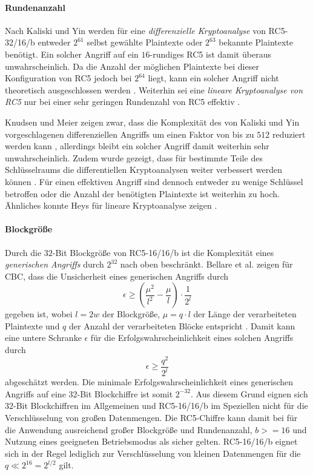 \documentclass[course=erap]{aspdoc}
\begin{document}
\paragraph{Rundenanzahl} Nach Kaliski und Yin werden für eine \textit{differenzielle Kryptoanalyse} von RC5-32/16/b entweder $2^{61}$ selbst gewählte Plaintexte oder $2^{63}$ bekannte Plaintexte benötigt. Ein solcher Angriff auf ein $16$-rundiges RC5 ist damit überaus unwahrscheinlich. Da die Anzahl der möglichen Plaintexte bei dieser Konfiguration von RC5 jedoch bei $2^{64}$ liegt, kann ein solcher Angriff nicht theoretisch ausgeschlossen werden \cite[p.6]{kaliski+yin}. Weiterhin sei eine \textit{lineare Kryptoanalyse von RC5} nur bei einer sehr geringen Rundenzahl von RC5 effektiv \cite[p.28]{kaliski+yin}.\bigbreak

Knudsen und Meier zeigen zwar, dass die Komplexität des von Kaliski und Yin vorgeschlagenen differenziellen Angriffs um einen Faktor von bis zu $512$ reduziert werden kann \cite[p.2]{knudsen+meier}, allerdings bleibt ein solcher Angriff damit weiterhin sehr unwahrscheinlich. Zudem wurde gezeigt, dass für bestimmte Teile des Schlüsselraums die differentiellen Kryptoanalysen weiter verbessert werden können \cite[p.13]{knudsen+meier}. Für einen effektiven Angriff sind dennoch entweder zu wenige Schlüssel betroffen oder die Anzahl der benötigten Plaintexte ist weiterhin zu hoch. Ähnliches konnte Heys für lineare Kryptoanalyse zeigen \cite[p.5]{heys}.

\paragraph{Blockgröße} Durch die $32$-Bit Blockgröße von RC5-16/16/b ist die Komplexität eines \textit{generischen Angriffs} durch $2^{32}$ nach oben beschränkt. Bellare et al. zeigen für CBC, dass die Unsicherheit eines generischen Angriffs durch
\[
    \epsilon \geq \left(\frac{\mu^2}{l^2} - \frac{\mu}{l}\right) \cdot \frac{1}{2^l}
\]
gegeben ist, wobei $l = 2w$ der Blockgröße, $\mu = q \cdot l$ der Länge der verarbeiteten Plaintexte und $q$ der Anzahl der verarbeiteten Blöcke entspricht \cite[p.5;24]{bellare}. Damit kann eine untere Schranke $\epsilon$ für die Erfolgswahrscheinlichkeit eines solchen Angriffs durch
\[
    \epsilon \geq \frac{q^2}{2^l}
\]
abgeschätzt werden. Die minimale Erfolgswahrscheinlichkeit eines generischen Angriffs auf eine 32-Bit Blockchiffre ist somit $2^{-32}$. Aus diesem Grund eignen sich $32$-Bit Blockchiffren im Allgemeinen und RC5-16/16/b im Speziellen nicht für die Verschlüsselung von großen Datenmengen. Die RC5-Chiffre kann damit bei für die Anwendung ausreichend großer Blockgröße und Rundenanzahl, $b >= 16$ und Nutzung eines geeigneten Betriebsmodus als sicher gelten. RC5-16/16/b eignet sich in der Regel lediglich zur Verschlüsselung von kleinen Datenmengen für die $q \ll 2^{16} = 2^{l/2}$ gilt.
\end{document}
